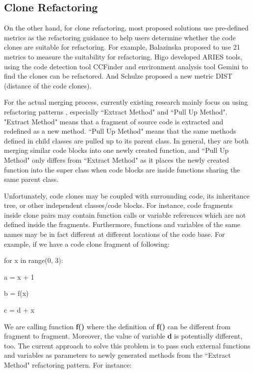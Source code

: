 \documentclass{acm_proc_article-sp}
\begin{document}
\subsection{Clone Refactoring}
On the other hand, for clone refactoring, most proposed solutions use pre-defined metrics as the refactoring guidance to help users determine whether the 
code clones are suitable for refactoring. For example, Balazinska \cite{balazinska} proposed to use 21 metrics to measure the suitability for refactoring. Higo \cite{higo}
developed ARIES tools, using the code detection tool CCFinder and environment analysis tool Gemini to find the clones can be refactored. And Schulze \cite{schulze}
proposed a new metric DIST (distance of the code clones). 

For the actual merging process, currently existing research mainly focus on using refactoring patterns \cite{fowler}, especially ``Extract Method" and ``Pull Up Method".
"Extract Method" means that a fragment of source code is extracted and redefined as a new method. ``Pull Up Method" means that the same methods defined in child
classes are pulled up to its parent class. In general, they are both merging similar code blocks into one newly created function, and ``Pull Up Method" only differs from 
``Extract Method" as it places the newly created function into the super class when code blocks are inside functions sharing the same parent class.

Unfortunately, code clones may be coupled with surrounding code, its inheritance tree, or other independent classes/code blocks. For instance, code fragments inside clone pairs
may contain function calls or variable references which are not defined inside the fragments. Furthermore, functions and variables of the same names may be in fact different
at different locations of the code base. For example, if we have a code clone fragment of following:

\IncMargin{1em}
\begin{algorithm}
	for x in range(0, 3):
	
		\Indp a = x + 1
		
		b = f(x)
		
		c = d + x
\end{algorithm}
\DecMargin{1em}

We are calling function {\bf f()} where the definition of {\bf f()} can be different from fragment to fragment. Moreover, the value of variable {\bf d} is potentially different, too.
The current approach to solve this problem is to pass such external functions and variables as parameters to newly generated methods from the ``Extract Method" refactoring pattern.
For instance:
\end{document}
